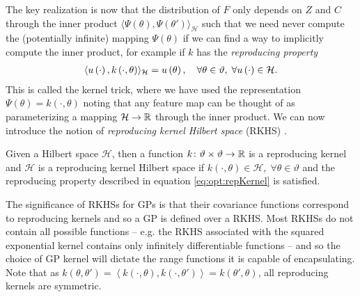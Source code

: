 The key realization is now that the distribution of $F$ only depends on $Z$ and $C$ through the inner product
$\langle\Psi\left(\theta\right), \Psi\left(\theta'\right)\rangle_{\mathcal{H}}$ such that we need never compute 
the (potentially infinite) mapping $\Psi\left(\theta\right)$ if we can find a way to implicitly compute the inner product, 
for example if $k$ has the \emph{reproducing property}
\begin{align}
\label{eq:opt:repKernel}
\langle u \left(\cdot\right), k\left(\cdot,\theta\right)\rangle_{\mathcal{H}} = u\left(\theta\right), \quad \forall \theta \in \vartheta, \; \forall u\left(\cdot\right) \in \mathcal{H}.
\end{align}
This is called the kernel trick, where we have used the representation $\Psi\left(\theta\right) = k\left(\cdot,\theta\right)$ noting that any feature map can be thought of as parameterizing a mapping $\mathcal{H} \rightarrow \mathbb{R}$ through the inner product.
We can now introduce the notion of \emph{reproducing kernel Hilbert space} (RKHS) \citep{aronszajn1950theory}.
\begin{definition}{}
	\label{def:opt:RKHS}
	Given a Hilbert space $\mathcal{H}$, then a function $k \colon \vartheta \times \vartheta \rightarrow \mathbb{R}$ is a reproducing
	kernel and  $\mathcal{H}$ is a reproducing kernel Hilbert space if
	$k\left(\cdot,\theta\right) \in \mathcal{H}, \; \forall \theta \in \vartheta$ and the reproducing property described in equation \eqref{eq:opt:repKernel} is satisfied.
\end{definition}
\noindent The significance of RKHSs for GPs is that their covariance functions correspond to reproducing kernels and
so a GP is defined over a RKHS.  Most RKHSs do not contain all possible functions -- e.g. the RKHS associated
with the squared exponential kernel contains only infinitely differentiable functions -- and so the choice
of GP kernel will dictate the range functions it is capable of encapsulating.
Note that as $k\left(\theta,\theta'\right) = \left\langle k\left(\cdot,\theta\right), k\left(\cdot,\theta'\right)\right\rangle = k\left(\theta',\theta\right)$, all reproducing kernels are symmetric.

